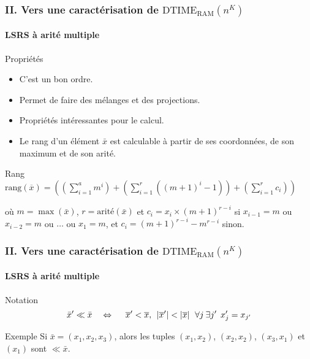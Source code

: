 \documentclass[10pt]{beamer}
\newcommand{\dtimeram}{\text{DTIME}_{\text{RAM}}\left( n^K \right)}
\newcommand{\rang}[1]{\text{rang}\left( #1 \right)}
\begin{document}
	
	\begin{frame}
		\frametitle{II. Vers une caractérisation de $\dtimeram$}
		\framesubtitle{LSRS à arité multiple}
		
		\begin{block}{Propriétés}
			\begin{itemize}
				\item 	C'est un bon ordre. %
				\item 	Permet de faire des mélanges et des projections. %
				\item 	Propriétés intéressantes pour le calcul. %
				\item 	Le rang d'un élément $\bar{x}$ est calculable à partir de ses coordonnées, de son maximum et de son arité.
			\end{itemize}
		\end{block}
		
		\pause 
		
		\begin{block}{Rang}
			$\rang{\overline{x}} = \left( \left( \sum_{i=1}^{a} m^i \right) + \left( \sum_{i=1}^{r} \left( \left(m+1\right)^i -1 \right) \right) + \left(\sum_{i=1}^{r} c_i \right) \right)$
			
			où $m = \max\left(\bar{x}\right)$, $r = \text{arité}(\bar{x})$ et $c_i = x_i \times \left(m+1\right)^{r-i}$ si $x_{i-1} = m$ ou $x_{i-2} = m$ ou $\dots$ ou $x_{1} = m$, et $c_i = \left(m+1\right)^{r-i}-m^{r-i}$ sinon. 
		\end{block}
		
	\end{frame}
	
	
	\begin{frame}
		\frametitle{II. Vers une caractérisation de $\dtimeram$}
		\framesubtitle{LSRS à arité multiple}
		
		\begin{block}{Notation}
			\[
				\bar{x}' \ll \bar{x} \ \ \ \Leftrightarrow \ \ \ \ \overline{x}' < \overline{x}, \:\: \left|\overline{x}'\right| < \left|\overline{x}\right| \:\: \forall j \: \exists j' \:\: x'_j = x_{j'}
			\]
		\end{block}
		
		\begin{block}{Exemple}
			Si $\bar{x} = \left( x_1, x_2, x_3 \right)$, alors les tuples $(x_1, x_2)$, $(x_2,x_2)$, $(x_3, x_1)$ et $(x_1)$ sont $\ll \bar{x}$.
		\end{block}
		
	\end{frame}
	
\end{document}
